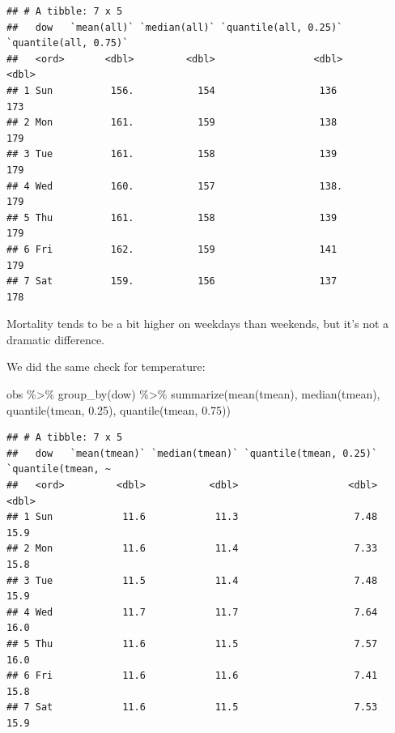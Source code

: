 \documentclass[
]{book}
\newenvironment{Shaded}{\begin{snugshade}}{\end{snugshade}}
\newcommand{\FloatTok}[1]{\textcolor[rgb]{0.00,0.00,0.81}{#1}}
\newcommand{\FunctionTok}[1]{\textcolor[rgb]{0.00,0.00,0.00}{#1}}
\newcommand{\NormalTok}[1]{#1}
\newcommand{\SpecialCharTok}[1]{\textcolor[rgb]{0.00,0.00,0.00}{#1}}
\begin{document}
\begin{verbatim}
## # A tibble: 7 x 5
##   dow   `mean(all)` `median(all)` `quantile(all, 0.25)` `quantile(all, 0.75)`
##   <ord>       <dbl>         <dbl>                 <dbl>                 <dbl>
## 1 Sun          156.           154                  136                    173
## 2 Mon          161.           159                  138                    179
## 3 Tue          161.           158                  139                    179
## 4 Wed          160.           157                  138.                   179
## 5 Thu          161.           158                  139                    179
## 6 Fri          162.           159                  141                    179
## 7 Sat          159.           156                  137                    178
\end{verbatim}

Mortality tends to be a bit higher on weekdays than weekends, but it's not
a dramatic difference.

We did the same check for temperature:

\begin{Shaded}
\begin{Highlighting}[]
\NormalTok{obs }\SpecialCharTok{\%\textgreater{}\%} 
  \FunctionTok{group\_by}\NormalTok{(dow) }\SpecialCharTok{\%\textgreater{}\%} 
  \FunctionTok{summarize}\NormalTok{(}\FunctionTok{mean}\NormalTok{(tmean), }
            \FunctionTok{median}\NormalTok{(tmean), }
            \FunctionTok{quantile}\NormalTok{(tmean, }\FloatTok{0.25}\NormalTok{), }
            \FunctionTok{quantile}\NormalTok{(tmean, }\FloatTok{0.75}\NormalTok{))}
\end{Highlighting}
\end{Shaded}

\begin{verbatim}
## # A tibble: 7 x 5
##   dow   `mean(tmean)` `median(tmean)` `quantile(tmean, 0.25)` `quantile(tmean, ~
##   <ord>         <dbl>           <dbl>                   <dbl>              <dbl>
## 1 Sun            11.6            11.3                    7.48               15.9
## 2 Mon            11.6            11.4                    7.33               15.8
## 3 Tue            11.5            11.4                    7.48               15.9
## 4 Wed            11.7            11.7                    7.64               16.0
## 5 Thu            11.6            11.5                    7.57               16.0
## 6 Fri            11.6            11.6                    7.41               15.8
## 7 Sat            11.6            11.5                    7.53               15.9
\end{verbatim}
\end{document}
